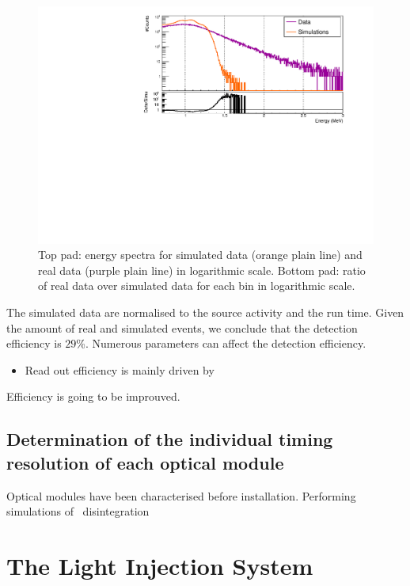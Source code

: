 \begin{figure}[h]
  \centering
  \includegraphics[width=17cm]{commissioning/fig_commissioning/Co_efficiency_detector.pdf}
  \caption{Top pad: energy spectra for simulated data (orange plain line) and real data (purple plain line) in logarithmic scale.
    Bottom pad: ratio of real data over simulated data for each bin in logarithmic scale.
\label{fig:detector_efficiency}}
\end{figure}
The simulated data are normalised to the source activity and the run time.
Given the amount of real and simulated events, we conclude that the detection efficiency is $29$\%.
Numerous parameters can affect the detection efficiency.
\begin{itemize}
\item Read out efficiency is mainly driven by
\end{itemize}


Efficiency is going to be improuved.
\subsection{Determination of the individual timing resolution of each optical module}

Optical modules have been characterised before installation.
Performing simulations of \Co\ disintegration






\section{The Light Injection System}
\label{sec:LIS}

